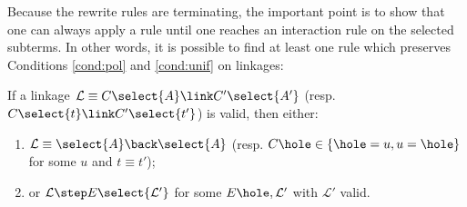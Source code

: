 


Because the rewrite rules are terminating, the important point is to show that
one can always apply a rule until one reaches an interaction rule on the
selected subterms. In other words, it is possible to find at least one rule
which preserves Conditions \ref{cond:pol} and \ref{cond:unif} on linkages:

\begin{lemma}\label{thm:vprogress} If a linkage $\mathcal{L} \equiv
  C\select{A} \link C'\select{A'}$ (resp. $C\select{t} \link C'\select{t'}$) is
  valid, then either:
  \begin{enumerate}
    \item $\mathcal{L} \equiv \select{A} \back \select{A}$ (resp. $C\hole \in \{\hole
    = u, u = \hole\}$ for some $u$ and $t \equiv t'$);
    \item or $\mathcal{L} \step E\select{\mathcal{L'}}$ for some $E\hole,
      \mathcal{L'}$ with $\mathcal{L'}$ valid.
  \end{enumerate}
\end{lemma}

